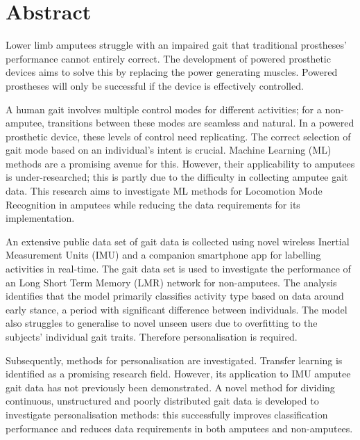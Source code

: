\chapter*{Abstract} %
Lower limb amputees struggle with an impaired gait that traditional prostheses' performance cannot entirely correct. The development of powered prosthetic devices aims to solve this by replacing the power generating muscles. Powered prostheses will only be successful if the device is effectively controlled.

A human gait involves multiple control modes for different activities; for a non-amputee, transitions between these modes are seamless and natural. In a powered prosthetic device, these levels of control need replicating. The correct selection of gait mode based on an individual's intent is crucial. Machine Learning (ML) methods are a promising avenue for this. However, their applicability to amputees is under-researched; this is partly due to the difficulty in collecting amputee gait data. This research aims to investigate ML methods for Locomotion Mode Recognition in amputees while reducing the data requirements for its implementation.

An extensive public data set of gait data is collected using novel wireless Inertial Measurement Units (IMU) and a companion smartphone app for labelling activities in real-time. The gait data set is used to investigate the performance of an Long Short Term Memory (LMR) network for non-amputees. The analysis identifies that the model primarily classifies activity type based on data around early stance, a period with significant difference between individuals. The model also struggles to generalise to novel unseen users due to overfitting to the subjects' individual gait traits. Therefore personalisation is required. 

Subsequently, methods for personalisation are investigated. Transfer learning is identified as a promising research field. However, its application to IMU amputee gait data has not previously been demonstrated. A novel method for dividing continuous, unstructured and poorly distributed gait data is developed to investigate personalisation methods: this successfully improves classification performance and reduces data requirements in both amputees and non-amputees.
